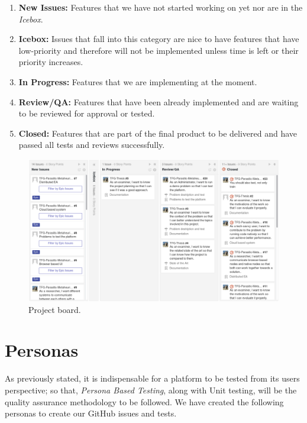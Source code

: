 \begin{enumerate}
	\item \textbf{New Issues:} Features that we have not started working on yet nor are in the \textit{Icebox}.
	
	\item \textbf{Icebox:} Issues that fall into this category are nice to have features that have low-priority and therefore will not be implemented unless time is left or their priority increases.  
	
	\item \textbf{In Progress:} Features that we are implementing at the moment.
	
	\item \textbf{Review/QA:} Features that have been already implemented and are waiting to be reviewed for approval or tested.
	
	\item \textbf{Closed:} Features that are part of the final product to be delivered and have passed all tests and reviews successfully.
\end{enumerate}

\begin{figure}[h!]
		\centering
    	\includegraphics[width=\linewidth]{assets/images/board.png}
    	\caption{Project board.}
    	\label{fig:board}
\end{figure}


\newcommand{\tabitem}{~~\llap{\textbullet}~~}
\section{Personas}
As previously stated, it is indispensable for a platform to be tested from its users perspective; so that, \textit{Persona Based Testing}, along with Unit testing, will be the quality assurance methodology to be followed. We have created the following personas to create our GitHub issues and tests.

